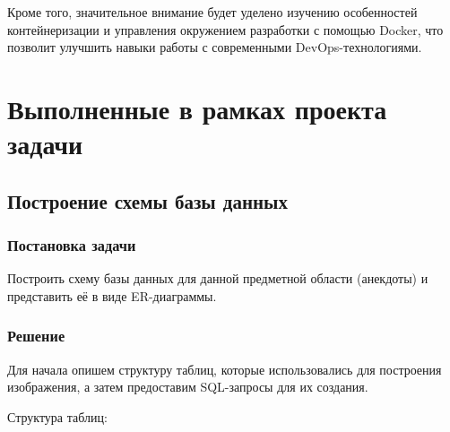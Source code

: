 \documentclass[pract]{SCWorks}
\begin{document}
Кроме того, значительное внимание будет уделено изучению особенностей
контейнеризации и управления окружением разработки с помощью Docker,
что позволит улучшить навыки работы с современными DevOps-технологиями.

\section{Выполненные в рамках проекта задачи}

\subsection{Построение схемы базы данных}

\subsubsection{Постановка задачи}

Построить схему базы данных для данной предметной области (анекдоты) и 
представить её в виде ER-диаграммы.

\subsubsection{Решение}

Для начала опишем структуру таблиц, которые использовались для построения
изображения, а затем предоставим SQL-запросы для их создания.

Структура таблиц:
\end{document}
